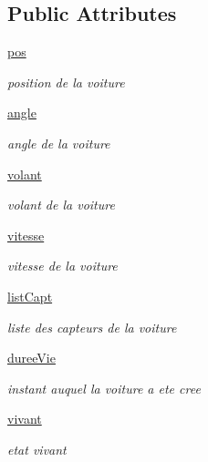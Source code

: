 \subsection*{Public Attributes}
\begin{DoxyCompactItemize}
\item 
\hyperlink{classsrc_1_1_voiture_1_1voiture_1_1_voiture_ac34e11869dc117239962990aa07dd980}{pos}
\begin{DoxyCompactList}\small\item\em position de la voiture \end{DoxyCompactList}\item 
\hyperlink{classsrc_1_1_voiture_1_1voiture_1_1_voiture_a808deb309ce297eb0493e9f6239a2e23}{angle}
\begin{DoxyCompactList}\small\item\em angle de la voiture \end{DoxyCompactList}\item 
\hyperlink{classsrc_1_1_voiture_1_1voiture_1_1_voiture_a2757624ed52879d1e8b5ea742b2146e2}{volant}
\begin{DoxyCompactList}\small\item\em volant de la voiture \end{DoxyCompactList}\item 
\hyperlink{classsrc_1_1_voiture_1_1voiture_1_1_voiture_aaabd3a8eee61977f2e0eb8e33c6ffe10}{vitesse}
\begin{DoxyCompactList}\small\item\em vitesse de la voiture \end{DoxyCompactList}\item 
\hyperlink{classsrc_1_1_voiture_1_1voiture_1_1_voiture_a206fd3cee2decf168d69061c7c439073}{list\+Capt}
\begin{DoxyCompactList}\small\item\em liste des capteurs de la voiture \end{DoxyCompactList}\item 
\hyperlink{classsrc_1_1_voiture_1_1voiture_1_1_voiture_a2612ae8592f5ede03ae7c2f02b356dc2}{duree\+Vie}
\begin{DoxyCompactList}\small\item\em instant auquel la voiture a ete cree \end{DoxyCompactList}\item 
\hyperlink{classsrc_1_1_voiture_1_1voiture_1_1_voiture_af5a21074454f983bc59e93ab09b44eda}{vivant}
\begin{DoxyCompactList}\small\item\em etat vivant \end{DoxyCompactList}\item 

\end{DoxyCompactItemize}
